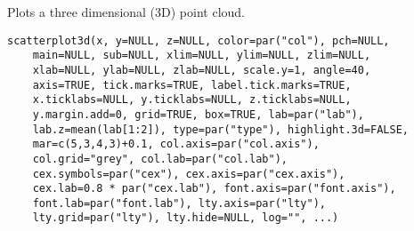 \begin{Description}\relax
Plots a three dimensional (3D) point cloud.
\end{Description}
\begin{Usage}
\begin{verbatim}
scatterplot3d(x, y=NULL, z=NULL, color=par("col"), pch=NULL,
    main=NULL, sub=NULL, xlim=NULL, ylim=NULL, zlim=NULL,
    xlab=NULL, ylab=NULL, zlab=NULL, scale.y=1, angle=40,
    axis=TRUE, tick.marks=TRUE, label.tick.marks=TRUE,
    x.ticklabs=NULL, y.ticklabs=NULL, z.ticklabs=NULL,
    y.margin.add=0, grid=TRUE, box=TRUE, lab=par("lab"),
    lab.z=mean(lab[1:2]), type=par("type"), highlight.3d=FALSE,
    mar=c(5,3,4,3)+0.1, col.axis=par("col.axis"),
    col.grid="grey", col.lab=par("col.lab"),
    cex.symbols=par("cex"), cex.axis=par("cex.axis"),
    cex.lab=0.8 * par("cex.lab"), font.axis=par("font.axis"),
    font.lab=par("font.lab"), lty.axis=par("lty"),
    lty.grid=par("lty"), lty.hide=NULL, log="", ...)
\end{verbatim}
\end{Usage}
